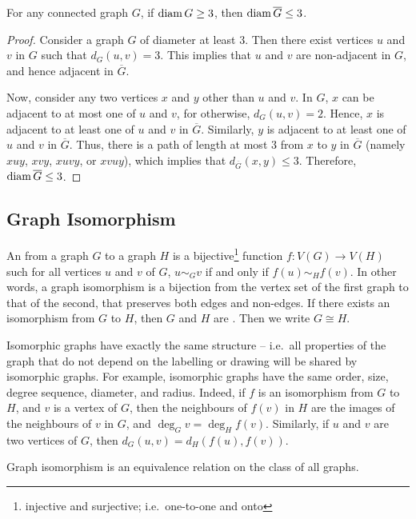 \begin{Theorem}\label{thm:Diam>=3}
For any connected graph $G$, if $\operatorname{diam} G \ge 3$, then $\operatorname{diam} \overline G \le 3$.
\end{Theorem}

\begin{proof}
Consider a graph $G$ of diameter at least $3$. Then there exist vertices $u$ and $v$ in $G$ such that $d_G(u, v) = 3$. This implies that $u$ and $v$ are non-adjacent in $G$, and hence adjacent in $\overline G$.

Now, consider any two vertices $x$ and $y$ other than $u$ and $v$. In $G$, $x$ can be adjacent to at most one of $u$ and $v$, for otherwise, $d_G(u,v) = 2$. Hence, $x$ is adjacent to at least one of $u$ and $v$ in $\overline G$. Similarly, $y$ is adjacent to at least one of $u$ and $v$ in $\overline G$. Thus, there is a path of length at most $3$ from $x$ to $y$ in $\overline G$ (namely $xuy$, $xvy$, $xuvy$, or $xvuy$), which implies that $d_{\overline G}(x, y) \le 3$. Therefore, $\operatorname{diam} \overline G \le 3$.
\end{proof}

\subsection{Graph Isomorphism}\label{subsec:Isomorphism}

An  from a graph $G$ to a graph $H$ is a bijective\footnote{injective and surjective; i.e.\ one-to-one and onto} function $f \colon V(G) \to V(H)$ such for all vertices $u$ and $v$ of $G$, $u \sim_G v$ if and only if $f(u) \sim_H f(v)$. In other words, a graph isomorphism is a bijection from the vertex set of the first graph to that of the second, that preserves both edges and non-edges. If there exists an isomorphism from $G$ to $H$, then $G$ and $H$ are . Then we write $G \cong H$.

Isomorphic graphs have exactly the same structure -- i.e.\ all properties of the graph that do not depend on the labelling or drawing will be shared by isomorphic graphs. For example, isomorphic graphs have the same order, size, degree sequence, diameter, and radius. Indeed, if $f$ is an isomorphism from $G$ to $H$, and $v$ is a vertex of $G$, then the neighbours of $f(v)$ in $H$ are the images of the neighbours of $v$ in $G$, and $\deg_G v = \deg_H f(v)$. Similarly, if $u$ and $v$ are two vertices of $G$, then $d_G(u, v) = d_H(f(u), f(v))$.

\begin{Theorem}
Graph isomorphism is an equivalence relation on the class of all graphs.
\end{Theorem}

